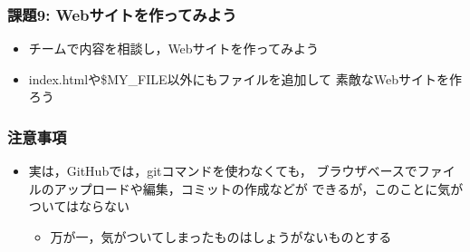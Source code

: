 \documentclass[a4paper,twoside,twocolumn]{bxjsarticle}
\begin{document}
\subsubsection{課題9: Webサイトを作ってみよう}
\label{sec-2-1-9}
\begin{itemize}
\item チームで内容を相談し，Webサイトを作ってみよう
\item index.htmlや\$MY\_FILE以外にもファイルを追加して
  素敵なWebサイトを作ろう
\end{itemize}

\subsubsection{注意事項}
\label{sec-2-1-10}
\begin{itemize}
\item 実は，GitHubでは，gitコマンドを使わなくても，
ブラウザベースでファイルのアップロードや編集，コミットの作成などが
できるが，このことに気がついてはならない
\begin{itemize}
\item 万が一，気がついてしまったものはしょうがないものとする
\end{itemize}
\end{itemize}
\end{document}
